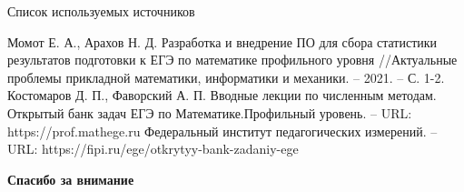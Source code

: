 \documentclass[aspectratio=169,12pt]{beamer}
\begin{document}
\begin{frame}{Список используемых источников}
    \begin{thebibliography}{10}
         Момот Е. А., Арахов Н. Д. Разработка и внедрение ПО для сбора статистики результатов подготовки к ЕГЭ по математике профильного уровня //Актуальные проблемы прикладной математики, информатики и механики. – 2021. – С. 1-2.
        Костомаров Д. П., Фаворский А. П. Вводные лекции по численным методам.
        Открытый банк задач ЕГЭ по Математике.Профильный уровень. – URL:  https://prof.mathege.ru
        Федеральный институт педагогических измерений. – URL:  https://fipi.ru/ege/otkrytyy-bank-zadaniy-ege
        
    \end{thebibliography}
\end{frame}

\begin{frame}
    \center\Large\textcolor{NordBrightBlue}{\textbf{Спасибо за внимание}}\\
\end{frame}
\end{document}
